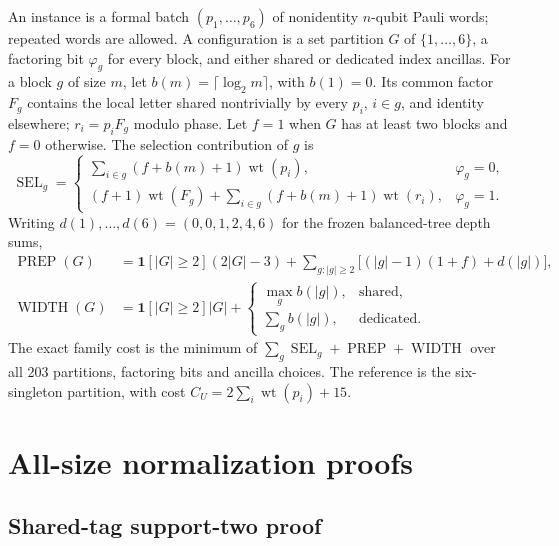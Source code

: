\documentclass[a4paper,onecolumn,11pt,unpublished,noarxiv]{quantumarticle}
\begin{document}
An instance is a formal batch $(p_1,\ldots,p_6)$ of nonidentity $n$-qubit Pauli words; repeated words are allowed.  A configuration is a set partition $G$ of $\{1,\ldots,6\}$, a factoring bit $\varphi_g$ for every block, and either shared or dedicated index ancillas.  For a block $g$ of size $m$, let $b(m)=\lceil\log_2m\rceil$, with $b(1)=0$.  Its common factor $F_g$ contains the local letter shared nontrivially by every $p_i$, $i\in g$, and identity elsewhere; $r_i=p_iF_g$ modulo phase.  Let $f=1$ when $G$ has at least two blocks and $f=0$ otherwise.  The selection contribution of $g$ is
\begin{equation}
\operatorname{SEL}_g=
\begin{cases}
\sum_{i\in g}(f+b(m)+1)\operatorname{wt}(p_i),&\varphi_g=0,\\
(f+1)\operatorname{wt}(F_g)+\sum_{i\in g}(f+b(m)+1)\operatorname{wt}(r_i),&\varphi_g=1.
\end{cases}
\end{equation}
Writing $d(1),\ldots,d(6)=(0,0,1,2,4,6)$ for the frozen balanced-tree depth sums,
\begin{align}
\operatorname{PREP}(G)&=\mathbf1[|G|\ge2](2|G|-3)+\sum_{g:|g|\ge2}\bigl[(|g|-1)(1+f)+d(|g|)\bigr],\\
\operatorname{WIDTH}(G)&=\mathbf1[|G|\ge2]|G|+
\begin{cases}
\max_g b(|g|),&\text{shared},\\
\sum_gb(|g|),&\text{dedicated}.
\end{cases}
\end{align}
The exact family cost is the minimum of $\sum_g\operatorname{SEL}_g+\operatorname{PREP}+\operatorname{WIDTH}$ over all 203 partitions, factoring bits and ancilla choices.  The reference is the six-singleton partition, with cost $C_U=2\sum_i\operatorname{wt}(p_i)+15$.

\section{All-size normalization proofs}\label{sec:normalization-proofs}

\subsection{Shared-tag support-two proof}
\end{document}
